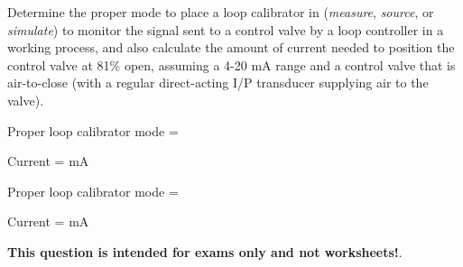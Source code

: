 

Determine the proper mode to place a loop calibrator in ({\it measure}, {\it source}, or {\it simulate}) to monitor the signal sent to a control valve by a loop controller in a working process, and also calculate the amount of current needed to position the control valve at 81\% open, assuming a 4-20 mA range and a control valve that is air-to-close (with a regular direct-acting I/P transducer supplying air to the valve).

\vskip 10pt

Proper loop calibrator mode = \underbar{\hskip 50pt}

\vskip 10pt

Current = \underbar{\hskip 50pt} mA







Proper loop calibrator mode = 

Current =  mA







{\bf This question is intended for exams only and not worksheets!}.



